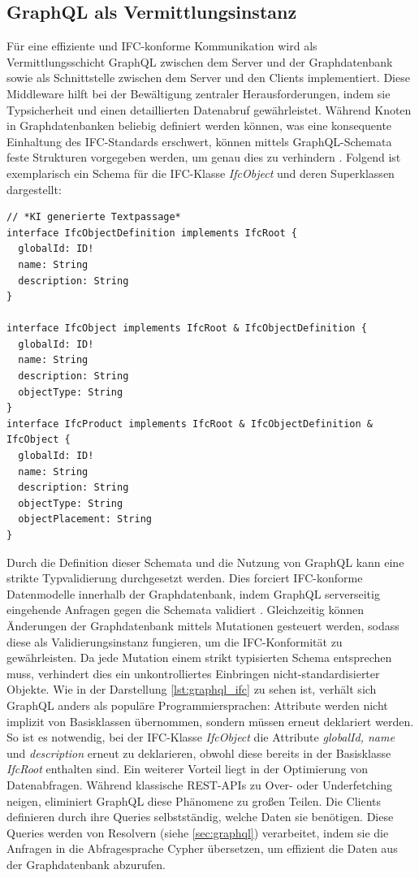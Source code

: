 \subsection{GraphQL als Vermittlungsinstanz}
Für eine effiziente und IFC-konforme Kommunikation wird als Vermittlungsschicht GraphQL zwischen dem Server und der Graphdatenbank sowie als Schnittstelle zwischen dem Server und den Clients implementiert. Diese Middleware hilft bei der Bewältigung zentraler Herausforderungen, indem sie Typsicherheit und einen detaillierten Datenabruf gewährleistet.
Während Knoten in Graphdatenbanken beliebig definiert werden können, was eine konsequente Einhaltung des IFC-Standards erschwert, können mittels GraphQL-Schemata feste Strukturen vorgegeben werden, um genau dies zu verhindern \cite{wolf_20206_graphql}.
Folgend ist exemplarisch ein Schema für die IFC-Klasse \textit{IfcObject} und deren Superklassen dargestellt:
\begin{lstlisting}[caption={GraphQL-Schema für IFC-Kernausschnitte}, label={lst:graphql_ifc}]
// *KI generierte Textpassage*
interface IfcObjectDefinition implements IfcRoot {
  globalId: ID!
  name: String
  description: String
}

interface IfcObject implements IfcRoot & IfcObjectDefinition {
  globalId: ID!
  name: String
  description: String
  objectType: String
}
interface IfcProduct implements IfcRoot & IfcObjectDefinition & IfcObject {
  globalId: ID!
  name: String
  description: String
  objectType: String
  objectPlacement: String
}
\end{lstlisting}
Durch die Definition dieser Schemata und die Nutzung von GraphQL kann eine strikte Typvalidierung durchgesetzt werden. Dies forciert IFC-konforme Datenmodelle innerhalb der Graphdatenbank, indem GraphQL serverseitig
eingehende Anfragen gegen die Schemata validiert \cite{wolf:2025:ifc2graphql}. Gleichzeitig können Änderungen der Graphdatenbank mittels Mutationen gesteuert werden, sodass diese als Validierungsinstanz fungieren, um die IFC-Konformität zu gewährleisten.
Da jede Mutation einem strikt typisierten Schema entsprechen muss, verhindert dies ein unkontrolliertes Einbringen nicht-standardisierter Objekte. Wie in der Darstellung \ref{lst:graphql_ifc} zu sehen ist, verhält sich GraphQL anders als
populäre Programmiersprachen: Attribute werden nicht implizit von Basisklassen übernommen, sondern müssen erneut deklariert werden. So ist es notwendig, bei der IFC-Klasse \textit{IfcObject} die Attribute \textit{globalId, name} und \textit{description} erneut
zu deklarieren, obwohl diese bereits in der Basisklasse \textit{IfcRoot} enthalten sind.
Ein weiterer Vorteil liegt in der Optimierung von Datenabfragen. Während klassische REST-APIs zu Over- oder Underfetching neigen, eliminiert GraphQL diese Phänomene zu großen Teilen. Die Clients definieren durch ihre Queries selbstständig, welche Daten
sie benötigen. Diese Queries werden von Resolvern (siehe \ref{sec:graphql}) verarbeitet, indem sie die Anfragen in die Abfragesprache Cypher übersetzen, um effizient die Daten aus der Graphdatenbank abzurufen.
